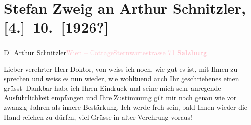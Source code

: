 

\renewcommand{\erwaehntePersonen}{Personen: Stefan Zweig}
\renewcommand{\erwaehnteOrte}{Orte: Salzburg, Sternwartestraße 71, Wien, Währinger Cottage, Zermatt}
\renewcommand{\erwaehnteWerke}{}
\section[Stefan Zweig an Arthur Schnitzler, {[}4.{]} 10. {[}1926?{]}]{Stefan Zweig an Arthur Schnitzler, {[}4.{]} 10. {[}1926?{]}}
\nopagebreak{}
\rehead{ }\normalsize\beginnumbering{}
\toendnotes[C]{\smallbreak\pagebreak[2]}
\toendnotes[C]{\smallbreak}\pstart{}{\pb}D\textsuperscript{r}
                  Arthur Schnitzler\pend{}\pstart{}\textcolor{pink}{Wien – Cottage}{}\ledrightnote{\textcolor{pink}{Währinger Cottage}}\pend{}\pstart{}\textcolor{pink}{Sternwartestrasse 71}{}\ledrightnote{\textcolor{pink}{Sternwartestraße 71}}\pend{}
{\bigskip}
\pstart
           \noindent{}\centering{}{\pb}\textcolor{gray}{\textbf{\textcolor{pink}{Salzburg}{}\ledrightnote{\textcolor{pink}{Salzburg}}}}\pend
           
\pstart
           \noindent{}{\pb}Lieber verehrter Herr
                  Doktor, von \label{K_L03663-1v}\label{K_L03663-1h} weiss ich noch, wie
               gut es ist, mit Ihnen zu sprechen und weiss es nun wieder, wie wohltuend auch Ihr
               geschriebenes \label{K_L03663-2v}\label{K_L03663-2h} einen grüsst: Dankbar habe ich Ihren Eindruck und seine mich sehr
               anregende Ausführlichkeit empfangen und Ihre Zustimmung gilt mir noch genau wie vor
               zwanzig Jahren als innere Bestärkung. Ich werde froh sein, bald Ihnen wieder die Hand
               reichen zu dürfen, viel Grüsse in alter Verehrung voraus! \pend
           
